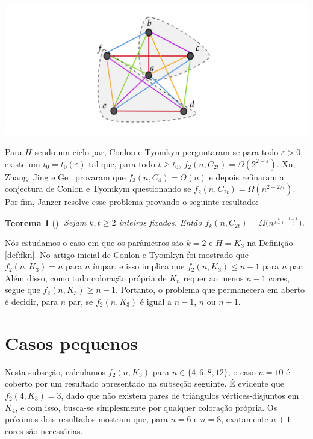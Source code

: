 \documentclass[12pt,a4paper]{book}
\let\eps=\varepsilon
\newtheorem{teorema}{Teorema}[chapter]
\begin{document}
  \begin{center}
			\includegraphics[scale=0.25, keepaspectratio=true]{K6-repet-mark.png}
			\label{fig:K6} 
	\end{center}
	

Para $H$ sendo um ciclo par, Conlon e Tyomkyn \cite{conlontyomkyn} perguntaram se para todo $\eps >0$,
existe um $t_0 = t_0(\eps)$ tal que, para todo 
$t \geq t_0$, $f_2(n, C_{2t}) = \Omega(2^{2-\eps})$.
%
Xu, Zhang, Jing e Ge~\cite{ge2020color} provaram que $f_3(n, C_4) = \Theta(n)$ e depois refinaram a conjectura de Conlon e Tyomkym questionando se
$f_2(n, C_{2t}) = \Omega(n^{2-2/t})$. 
Por fim, Janzer \cite{janzer2023rainbow} resolve esse problema provando o seguinte resultado:
 
    \begin{teorema}[\cite{janzer2023rainbow}]\label{teo:janzer-ciclos}
           Sejam $k,t \geq 2$ inteiros fixados. Então $f_k(n,C_{2t}) = \Omega\big(n^{\frac{k}{k-1} \cdot\frac{t-1}{t}}\big)$.
    \end{teorema}

Nós estudamos o caso em que os parâmetros são $k = 2$ e $H = K_3$ na Definição \ref{def:fkn}. 
No artigo inicial de Conlon e Tyomkyn foi mostrado que $f_2(n,K_3) = n$ para
$n$ ímpar, e isso implica que $f_2(n,K_3) \leq n + 1$ para $n$ par. 
Além disso, como toda coloração própria de $K_n$ requer ao menos $n-1$ cores, segue que $f_2(n,K_3) \geq n- 1$.
Portanto, o problema que permanecera em aberto é decidir, para $n$ par, se $f_2(n,K_3)$ é igual a $n-1$, $n$ ou $n + 1$.

\section{Casos pequenos}

Nesta subseção, calculamos $f_2(n,K_3)$ para $n \in \{4,6,8,12\}$, o caso $n=10$ é coberto por um resultado apresentado na subseção seguinte. 
É evidente que $f_2(4,K_3) = 3$, dado que não existem pares de triângulos vértices-disjuntos em $K_4$, e com isso, busca-se simplesmente por qualquer coloração própria. 
Os próximos dois resultados mostram que, para $n = 6$ e $n = 8$, exatamente $n + 1$ cores são necessárias.
\end{document}
